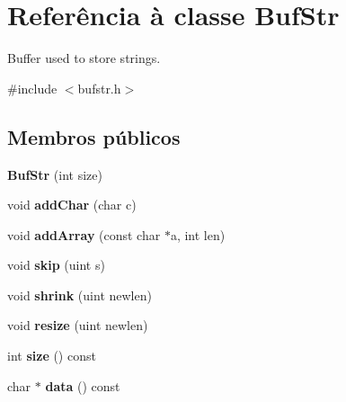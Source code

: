 \hypertarget{class_buf_str}{\section{Referência à classe Buf\-Str}
\label{class_buf_str}
}


Buffer used to store strings.  




{\ttfamily \#include $<$bufstr.\-h$>$}

\subsection*{Membros públicos}
\begin{DoxyCompactItemize}
\item 
\hypertarget{class_buf_str_a80502a5b7e4671d655936afceb70d699}{{\bfseries Buf\-Str} (int size)}\label{class_buf_str_a80502a5b7e4671d655936afceb70d699}

\item 
\hypertarget{class_buf_str_a2526ae572a2d9b53c8cf2f1feeacfdf5}{void {\bfseries add\-Char} (char c)}\label{class_buf_str_a2526ae572a2d9b53c8cf2f1feeacfdf5}

\item 
\hypertarget{class_buf_str_a962fe2143b2853324ed929f10b7332e2}{void {\bfseries add\-Array} (const char $\ast$a, int len)}\label{class_buf_str_a962fe2143b2853324ed929f10b7332e2}

\item 
\hypertarget{class_buf_str_ab2bdb94cd721f02b5f2df8ee54069ee2}{void {\bfseries skip} (uint s)}\label{class_buf_str_ab2bdb94cd721f02b5f2df8ee54069ee2}

\item 
\hypertarget{class_buf_str_adce9163b3adad67be0781f8be1e92669}{void {\bfseries shrink} (uint newlen)}\label{class_buf_str_adce9163b3adad67be0781f8be1e92669}

\item 
\hypertarget{class_buf_str_a6df66cc573f9a8bd351cbbc4f4021b23}{void {\bfseries resize} (uint newlen)}\label{class_buf_str_a6df66cc573f9a8bd351cbbc4f4021b23}

\item 
\hypertarget{class_buf_str_ab8e4e3e2a7bf18888b71bdf9dda0770b}{int {\bfseries size} () const }\label{class_buf_str_ab8e4e3e2a7bf18888b71bdf9dda0770b}

\item 
\hypertarget{class_buf_str_ad9319003da5b44fcac43001237ecb9cd}{char $\ast$ {\bfseries data} () const }\label{class_buf_str_ad9319003da5b44fcac43001237ecb9cd}


\end{DoxyCompactItemize}
